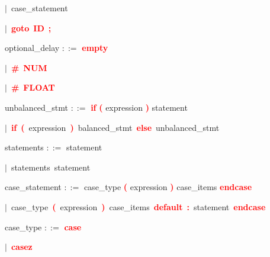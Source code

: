 \mbox{$|$ case\_statement}

\mbox{$|$ \textbf{\textcolor{red}{goto}} \textbf{\textcolor{red}{ID}} \textbf{\textcolor{red}{;}}}

\vspace{1em}
\noindent
\settowidth{\parindent}{\hspace{4ex}}
optional\_delay $::=$\hspace{1ex} \textbf{\textcolor{red}{empty}}

\mbox{$|$ \textbf{\textcolor{red}{\textbf{\textcolor{red}{\#}}}} \textbf{\textcolor{red}{NUM}}}

\mbox{$|$ \textbf{\textcolor{red}{\textbf{\textcolor{red}{\#}}}} \textbf{\textcolor{red}{FLOAT}}}

\vspace{1em}
\noindent
\settowidth{\parindent}{\hspace{4ex}}
unbalanced\_stmt $::=$\hspace{1ex} \textbf{\textcolor{red}{if}} \textbf{\textcolor{red}{(}} expression \textbf{\textcolor{red}{)}} statement

\mbox{$|$ \textbf{\textcolor{red}{if}} \textbf{\textcolor{red}{(}} expression \textbf{\textcolor{red}{)}} balanced\_stmt \textbf{\textcolor{red}{else}} unbalanced\_stmt}

\vspace{1em}
\noindent
\settowidth{\parindent}{\hspace{4ex}}
statements $::=$\hspace{1ex} statement

\mbox{$|$ statements statement}

\vspace{1em}
\noindent
\settowidth{\parindent}{\hspace{4ex}}
case\_statement $::=$\hspace{1ex} case\_type \textbf{\textcolor{red}{(}} expression \textbf{\textcolor{red}{)}} case\_items \textbf{\textcolor{red}{endcase}}

\mbox{$|$ case\_type \textbf{\textcolor{red}{(}} expression \textbf{\textcolor{red}{)}} case\_items \textbf{\textcolor{red}{default}} \textbf{\textcolor{red}{:}} statement \textbf{\textcolor{red}{endcase}}}

\vspace{1em}
\noindent
\settowidth{\parindent}{\hspace{4ex}}
case\_type $::=$\hspace{1ex} \textbf{\textcolor{red}{case}}

\mbox{$|$ \textbf{\textcolor{red}{casez}}}

